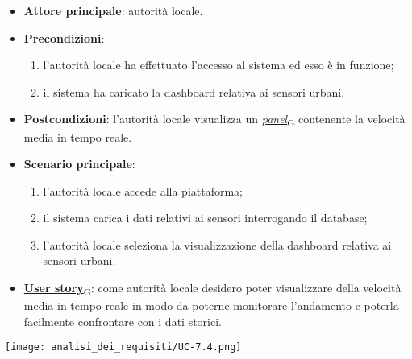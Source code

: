 \begin{itemize}
	\item \textbf{Attore principale}: autorità locale.
	\item \textbf{Precondizioni}:
	      \begin{enumerate}
		      \item l'autorità locale ha effettuato l'accesso al sistema ed esso è in funzione;
		      \item il sistema ha caricato la dashboard relativa ai sensori urbani.
	      \end{enumerate}
	\item \textbf{Postcondizioni}: l'autorità locale visualizza un \href{https://7last.github.io/docs/rtb/documentazione-interna/glossario\#panel}{\textit{panel}\textsubscript{G}} contenente la velocità media in tempo reale.
	\item \textbf{Scenario principale}:
	      \begin{enumerate}
		      \item l'autorità locale accede alla piattaforma;
		      \item il sistema carica i dati relativi ai sensori interrogando il database;
		      \item l'autorità locale seleziona la visualizzazione della dashboard relativa ai sensori urbani.
	      \end{enumerate}
	\item \href{https://7last.github.io/docs/rtb/documentazione-interna/glossario\#user-story}{\textbf{User story}\textsubscript{G}}:
	      come autorità locale desidero poter visualizzare della velocità media in tempo reale in modo da poterne monitorare l'andamento
	      e poterla facilmente confrontare con i dati storici.
\end{itemize}
\begin{center}
	\texttt{[image: analisi\_dei\_requisiti/UC-7.4.png]}
\end{center}


